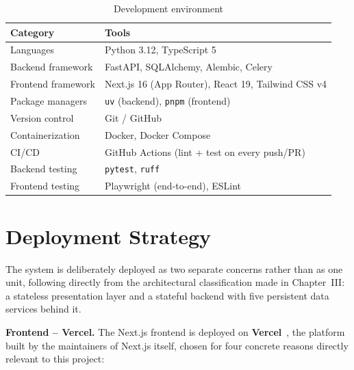 \documentclass[12pt,a4paper]{report}
\begin{document}
\begin{table}[H]
\centering
\caption{Development environment}
\label{tab:devenv}
\begin{tabularx}{\textwidth}{@{}l X@{}}
\toprule
\textbf{Category} & \textbf{Tools} \\
\midrule
Languages & Python 3.12, TypeScript 5 \\
Backend framework & FastAPI, SQLAlchemy, Alembic, Celery \\
Frontend framework & Next.js 16 (App Router), React 19, Tailwind CSS v4 \\
Package managers & \texttt{uv} (backend), \texttt{pnpm} (frontend) \\
Version control & Git / GitHub \\
Containerization & Docker, Docker Compose \\
\ac{CI/CD} & GitHub Actions (lint + test on every push/PR) \\
Backend testing & \texttt{pytest}, \texttt{ruff} \\
Frontend testing & Playwright (end-to-end), ESLint \\
\bottomrule
\end{tabularx}
\end{table}

\section{Deployment Strategy}

The system is deliberately deployed as two separate concerns rather than
as one unit, following directly from the architectural classification made
in Chapter~III: a stateless presentation layer and a stateful backend with
five persistent data services behind it.

\textbf{Frontend -- Vercel.} The Next.js frontend is deployed on
\textbf{Vercel}~\cite{vercel}, the platform built by the maintainers of
Next.js itself, chosen for four concrete reasons directly relevant to this
project:
\end{document}
